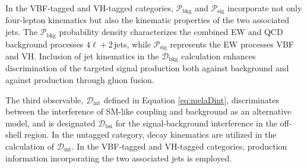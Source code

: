 In the VBF-tagged and VH-tagged categories, $\mathcal{P}_\text{bkg}$ and $\mathcal{P}_\text{sig}$ incorporate
not only four-lepton kinematics but also the kinematic properties of the two associated jets.
The $\mathcal{P}_\text{bkg}$ probability density characterizes the combined EW and QCD background processes $4\ell+2$\,jets,
while $\mathcal{P}_\text{sig}$ represents the EW processes VBF and VH. Inclusion of jet kinematics in the
$\mathcal{D}_\text{bkg}$ calculation enhances discrimination of the targeted signal production both against background
and against \Hboson production through gluon fusion.

The third observable, $\mathcal{D}_\text{int}$ defined in Equation \ref{eq:melaDint}, discriminates between the interference
of SM-like \Hboson coupling and background as an alternative model, and is designated
$\mathcal{D}_\text{bsi}$ for the signal-background interference in the off-shell region.
In the untagged category, decay kinematics are utilized in the calculation of $\mathcal{D}_\text{int}$.
In the VBF-tagged and VH-tagged categories, production information incorporating the two associated jets is employed.



